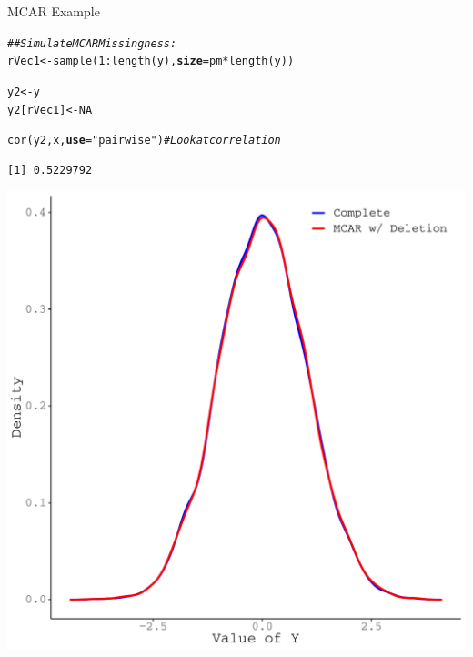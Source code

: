 \documentclass{beamer}\usepackage[]{graphicx}\usepackage[]{color}
\makeatletter
\newcommand{\hlnum}[1]{\textcolor[rgb]{0.69,0.494,0}{#1}}%
\newcommand{\hlstr}[1]{\textcolor[rgb]{0.749,0.012,0.012}{#1}}%
\newcommand{\hlcom}[1]{\textcolor[rgb]{0.514,0.506,0.514}{\textit{#1}}}%
\newcommand{\hlopt}[1]{\textcolor[rgb]{0,0,0}{#1}}%
\newcommand{\hlstd}[1]{\textcolor[rgb]{0,0,0}{#1}}%
\newcommand{\hlkwb}[1]{\textcolor[rgb]{0,0.341,0.682}{#1}}%
\newcommand{\hlkwc}[1]{\textcolor[rgb]{0,0,0}{\textbf{#1}}}%
\newcommand{\hlkwd}[1]{\textcolor[rgb]{0.004,0.004,0.506}{#1}}%
\newenvironment{kframe}{%
 \def\at@end@of@kframe{}%
 \ifinner\ifhmode%
  \def\at@end@of@kframe{\end{minipage}}%
  \begin{minipage}{\columnwidth}%
 \fi\fi%
 \def\FrameCommand##1{\hskip\@totalleftmargin \hskip-\fboxsep
 \colorbox{shadecolor}{##1}\hskip-\fboxsep
     \hskip-\linewidth \hskip-\@totalleftmargin \hskip\columnwidth}%
 \MakeFramed {\advance\hsize-\width
   \@totalleftmargin\z@ \linewidth\hsize
   \@setminipage}}%
 {\par\unskip\endMakeFramed%
 \at@end@of@kframe}
\newenvironment{knitrout}{}{} %
\makeatother
\begin{document}
\begin{frame}{MCAR Example}
  
\begin{knitrout}\footnotesize
{}\color{fgcolor}\begin{kframe}
\begin{alltt}
\hlcom{## Simulate MCAR Missingness:}
\hlstd{rVec1} \hlkwb{<-} \hlkwd{sample}\hlstd{(}\hlnum{1} \hlopt{:} \hlkwd{length}\hlstd{(y),} \hlkwc{size} \hlstd{= pm} \hlopt{*} \hlkwd{length}\hlstd{(y))}

\hlstd{y2} \hlkwb{<-} \hlstd{y}
\hlstd{y2[rVec1]} \hlkwb{<-} \hlnum{NA}

\hlkwd{cor}\hlstd{(y2, x,} \hlkwc{use} \hlstd{=} \hlstr{"pairwise"}\hlstd{)} \hlcom{# Look at correlation}
\end{alltt}
\begin{verbatim}
[1] 0.5229792
\end{verbatim}
\end{kframe}
\end{knitrout}

\pagebreak

\begin{knitrout}\footnotesize
{}\color{fgcolor}

{\centering \includegraphics[width=0.65\linewidth]{figure/intro-unnamed-chunk-12-1} 

}


\end{knitrout}

\end{frame}

\end{document}
